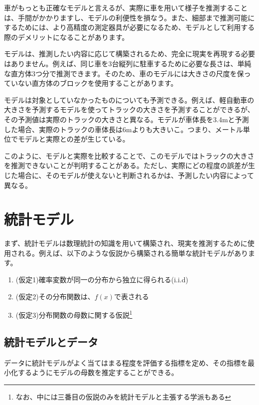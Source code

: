 車がもっとも正確なモデルと言えるが、実際に車を用いて様子を推測することは、手間がかかりますし、モデルの利便性を損なう。また、細部まで推測可能にするためには、より高精度の測定器具が必要になるため、モデルとして利用する際のデメリットになることがあります。

モデルは、推測したい内容に応じて構築されるため、完全に現実を再現する必要はありません。例えば、同じ車を3台縦列に駐車するために必要な長さは、単純な直方体3つ分で推測できます。そのため、車のモデルには大きさの尺度を保っていない直方体のブロックを使用することがあります。

モデルは対象としていなかったものについても予測できる。例えば、軽自動車の大きさを予測するモデルを使ってトラックの大きさを予測することができるが、その予測値は実際のトラックの大きさと異なる。モデルが車体長を3.4mと予測した場合、実際のトラックの車体長は6mよりも大きいこ。つまり、メートル単位でモデルと実際との差が生じている。

このように、モデルと実際を比較することで、このモデルではトラックの大きさを推測できないことが判明することがある。ただし、実際にどの程度の誤差が生じた場合に、そのモデルが使えないと判断されるかは、予測したい内容によって異なる。


\section{統計モデル}
まず、統計モデルは数理統計の知識を用いて構築され、現実を推測するために使用される。例えば、以下のような仮説から構築される簡単な統計モデルがあります。

\begin{enumerate}
    \item (仮定1)確率変数が同一の分布から独立に得られる(i.i.d)
    \item (仮定2)その分布関数は、$f(x)$で表される
    \item (仮定3)分布関数の母数に関する仮説\footnote{なお、中には三番目の仮説のみを統計モデルと主張する学派もある\cite{塩見_正衛2021}}
\end{enumerate}

\subsection{統計モデルとデータ}
データに統計モデルがよく当てはまる程度を評価する指標を定め、その指標を最小化するようにモデルの母数を推定することができる。



